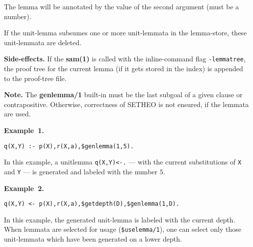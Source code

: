 The lemma will be annotated by the value of the second argument
(must be a number).

If the unit-lemma subsumes one or more unit-lemmata in the lemma-store,
these unit-lemmata are deleted.

\vspace*{0.5cm}
\noindent
{\bf Side-effects.}
If the {\bf sam(1)} is called with the inline-command flag {\tt -lemmatree},
the proof tree for the current lemma (if it gets stored in the index)
is appended to the proof-tree file.

\vspace*{0.5cm}
\noindent
{\bf Note.}
The {\bf genlemma/1} built-in must be the last subgoal of a given
clause or contrapositive.
Otherwise, correctness of SETHEO is not ensured, if the lemmata are
used.

\vspace*{0.5cm}
\noindent
{\bf Example~1.}
\begin{verbatim}
q(X,Y) :- p(X),r(X,a),$genlemma(1,5).
\end{verbatim}

In this example, a unitlemma {\tt q(X,Y)<-.} --- with the current substitutions of {\tt X} and {\tt Y} --- is generated and labeled with the number $5$.

\vspace*{0.5cm}
\noindent
{\bf Example~2.}
\begin{verbatim}
q(X,Y) <- p(X),r(X,a),$getdepth(D),$genlemma(1,D).
\end{verbatim}

In this example, the generated unit-lemma is labeled with the current
depth. When lemmata are selected for usage ({\tt \$uselemma/1}), one
can select only those unit-lemmata which have been generated on a lower
depth.
